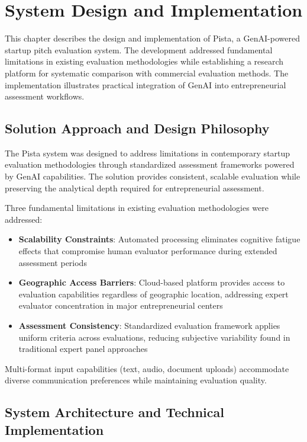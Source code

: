 \chapter{System Design and Implementation} \label{ch:problem-solution}

This chapter describes the design and implementation of Pista, a GenAI-powered startup pitch evaluation system. The development addressed fundamental limitations in existing evaluation methodologies while establishing a research platform for systematic comparison with commercial evaluation methods. The implementation illustrates practical integration of GenAI into entrepreneurial assessment workflows.

\section{Solution Approach and Design Philosophy} \label{sec:solution-approach}

The Pista system was designed to address limitations in contemporary startup evaluation methodologies through standardized assessment frameworks powered by GenAI capabilities. The solution provides consistent, scalable evaluation while preserving the analytical depth required for entrepreneurial assessment.

Three fundamental limitations in existing evaluation methodologies were addressed:

\begin{itemize}
  \item \textbf{Scalability Constraints}: Automated processing eliminates cognitive fatigue effects that compromise human evaluator performance during extended assessment periods \cite{Hirshleifer2019}
  \item \textbf{Geographic Access Barriers}: Cloud-based platform provides access to evaluation capabilities regardless of geographic location, addressing expert evaluator concentration in major entrepreneurial centers \cite{Colombo2019}
  \item \textbf{Assessment Consistency}: Standardized evaluation framework applies uniform criteria across evaluations, reducing subjective variability found in traditional expert panel approaches \cite{Gius2024}
\end{itemize}

Multi-format input capabilities (text, audio, document uploads) accommodate diverse communication preferences while maintaining evaluation quality.


\section{System Architecture and Technical Implementation} \label{sec:system-design}

